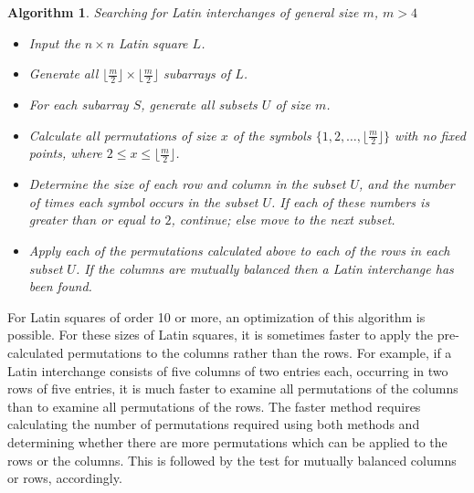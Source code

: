 \documentclass[12pt]{report}
\newtheorem{algorithm}{Algorithm}
\begin{document}
\begin{algorithm}{Searching for Latin interchanges of general size $m$, $m > 4$}
\label{genint}
\begin{itemize}
\item Input the $n \times n$ Latin square $L$.

\item Generate all $\lfloor \displaystyle{\frac{m}{2}} \rfloor \times 
\lfloor \displaystyle{\frac{m}{2}} \rfloor$
subarrays of $L$.

\item For each subarray $S$, generate all subsets $U$ of size 
$m$.

\item Calculate all permutations of size $x$ of the symbols 
$\{1,2,\dots,\lfloor \displaystyle{\frac{m}{2}} \rfloor \}$ with no fixed points, where 
$2\leq x \leq \lfloor \displaystyle{\frac{m}{2}} \rfloor$.
\item Determine the size of each row and column in the subset $U$, and
the number of times each symbol occurs in the subset $U$. If each
of these numbers is greater than or equal to $2$, continue; else
move to the next subset.

\item Apply each of the permutations calculated above to each of 
the rows in each subset $U$.
If the columns are mutually balanced then a Latin interchange has been found.
\end{itemize}
\end{algorithm}

For Latin squares of order 10 or more, an optimization of this algorithm is possible.
For these sizes of Latin squares, it is sometimes faster to apply the
pre-calculated permutations to the columns rather than the rows.  For
example, if a Latin interchange consists of five columns of two entries each,
occurring in two rows of five entries, it is much faster to examine all
permutations of the columns than to examine all permutations of the rows.
The faster method requires calculating the number of permutations required
using both methods and determining whether there are more permutations
which can be applied to the rows or the columns.  This is followed by
the test for mutually balanced columns or rows, accordingly.
\end{document}
